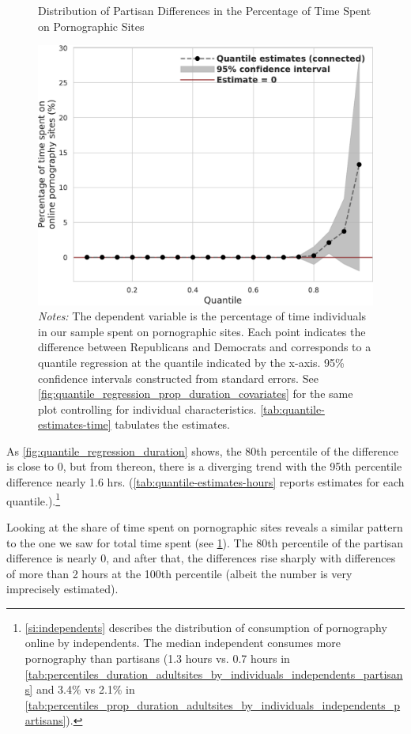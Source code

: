 \documentclass[12pt, letterpaper]{article}
\begin{document}
\begin{figure}[t]
	\centering
	\caption{Distribution of Partisan Differences in the Percentage of Time Spent on Pornographic Sites}
	\includegraphics[width=.7\linewidth]{figs/quantile_reg_proportion_duration_adult.pdf}
	\caption*{\footnotesize \emph{Notes:} 
		The dependent variable is the percentage of time individuals in our sample spent on pornographic sites.
		Each point indicates the difference between Republicans and Democrats and corresponds to a quantile regression at the quantile indicated by the x-axis.
		95\% confidence intervals constructed from standard errors.
		See \cref{fig:quantile_regression_prop_duration_covariates} for the same plot controlling for individual characteristics.
            \cref{tab:quantile-estimates-time} tabulates the estimates.
	}
	\label{fig:quantile_regression_prop_duration}
\end{figure}

As \cref{fig:quantile_regression_duration} shows, the 80th percentile of the difference is close to 0, but from thereon, there is a diverging trend with the 95th percentile difference nearly 1.6 hrs. (\cref{tab:quantile-estimates-hours} reports estimates for each quantile.).\footnote{\cref{si:independents} describes the distribution of consumption of pornography online by independents. The median independent consumes more pornography than partisans (1.3 hours vs. 0.7 hours in \cref{tab:percentiles_duration_adultsites_by_individuals_independents_partisans} and 3.4\% vs 2.1\% in \cref{tab:percentiles_prop_duration_adultsites_by_individuals_independents_partisans}).}

Looking at the share of time spent on pornographic sites reveals a similar pattern to the one we saw for total time spent (see \cref{fig:quantile_regression_prop_duration}). The 80th percentile of the partisan difference is nearly 0, and after that, the differences rise sharply with differences of more than 2 hours at the 100th percentile (albeit the number is very imprecisely estimated).
\end{document}

